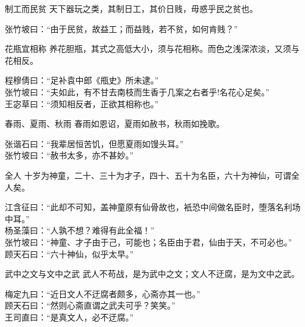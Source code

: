 \begin{yulu}{制工而民贫}
天下器玩之类，其制日工，其价日贱，毋惑乎民之贫也。
\begin{comments}
张竹坡曰：“由于民贫，故益工；而益贱，若不贫，如何肯贱？”
\end{comments}
\end{yulu}

\begin{yulu}{花瓶宜相称}
养花胆瓶，其式之高低大小，须与花相称。而色之浅深浓淡，又须与花相反。
\begin{comments}
程穆倩曰：“足补袁中郎《甁史》所未逮。” \\
张竹坡曰：“夫如此，有不甘去南枝而生香于几案之右者乎!名花心足矣。” \\
王宓草曰：“须知相反者，正欲其相称也。”
\end{comments}
\end{yulu}

\begin{yulu}{春雨、夏雨、秋雨}
春雨如恩诏，夏雨如赦书，秋雨如挽歌。
\begin{comments}
张谐石曰：“我辈居恒苦饥，但愿夏雨如馒头耳。” \\
张竹坡曰：“赦书太多，亦不甚妙。”
\end{comments}
\end{yulu}

\begin{yulu}{全人}
十岁为神童，二十、三十为才子，四十、五十为名臣，六十为神仙，可谓全人矣。
\begin{comments}
江含征曰：“此却不可知，盖神童原有仙骨故也，衹恐中间做名臣时，堕落名利场中耳。” \\
杨圣藻曰：“人孰不想？难得有此全福！” \\
张竹坡曰：“神童、才子由于己，可能也；名臣由于君，仙由于天，不可必也。” \\
顾天石曰：“六十神仙，似乎太早。”
\end{comments}
\end{yulu}

\begin{yulu}{武中之文与文中之武}
武人不苟战，是为武中之文；文人不迂腐，是为文中之武。
\begin{comments}
梅定九曰：“近日文人不迂腐者颇多，心斋亦其一也。” \\
顾天石曰：“然则心斋直谓之武夫可乎？笑笑。” \\
王司直曰：“是真文人，必不迂腐。”
\end{comments}
\end{yulu}

